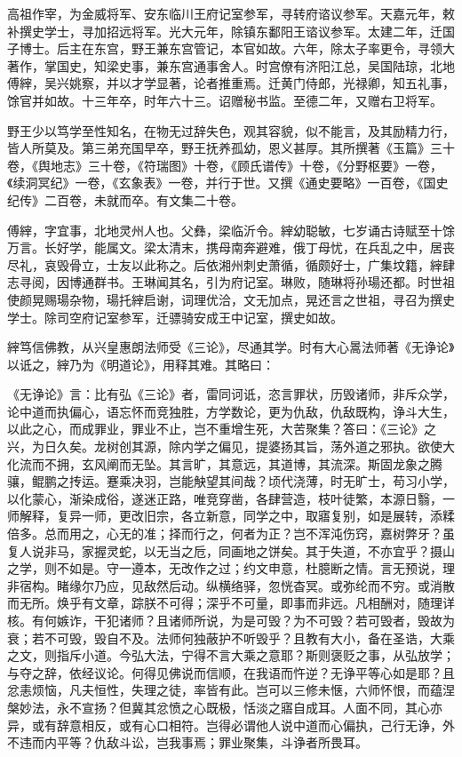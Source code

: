 \documentclass[]{article}
\begin{document}
高祖作宰，为金威将军、安东临川王府记室参军，寻转府谘议参军。天嘉元年，敕补撰史学士，寻加招远将军。光大元年，除镇东鄱阳王谘议参军。太建二年，迁国子博士。后主在东宫，野王兼东宫管记，本官如故。六年，除太子率更令，寻领大著作，掌国史，知梁史事，兼东宫通事舍人。时宫僚有济阳江总，吴国陆琼，北地傅縡，吴兴姚察，并以才学显著，论者推重焉。迁黄门侍郎，光禄卿，知五礼事，馀官并如故。十三年卒，时年六十三。诏赠秘书监。至德二年，又赠右卫将军。

野王少以笃学至性知名，在物无过辞失色，观其容貌，似不能言，及其励精力行，皆人所莫及。第三弟充国早卒，野王抚养孤幼，恩义甚厚。其所撰著《玉篇》三十卷，《舆地志》三十卷，《符瑞图》十卷，《顾氏谱传》十卷，《分野枢要》一卷，《续洞冥纪》一卷，《玄象表》一卷，并行于世。又撰《通史要略》一百卷，《国史纪传》二百卷，未就而卒。有文集二十卷。

傅縡，字宜事，北地灵州人也。父彝，梁临沂令。縡幼聪敏，七岁诵古诗赋至十馀万言。长好学，能属文。梁太清末，携母南奔避难，俄丁母忧，在兵乱之中，居丧尽礼，哀毁骨立，士友以此称之。后依湘州刺史萧循，循颇好士，广集坟籍，縡肆志寻阅，因博通群书。王琳闻其名，引为府记室。琳败，随琳将孙瑒还都。时世祖使颜晃赐瑒杂物，瑒托縡启谢，词理优洽，文无加点，晃还言之世祖，寻召为撰史学士。除司空府记室参军，迁骠骑安成王中记室，撰史如故。

縡笃信佛教，从兴皇惠朗法师受《三论》，尽通其学。时有大心暠法师著《无诤论》以诋之，縡乃为《明道论》，用释其难。其略曰：

《无诤论》言：比有弘《三论》者，雷同诃诋，恣言罪状，历毁诸师，非斥众学，论中道而执偏心，语忘怀而竞独胜，方学数论，更为仇敌，仇敌既构，诤斗大生，以此之心，而成罪业，罪业不止，岂不重增生死，大苦聚集？答曰：《三论》之兴，为日久矣。龙树创其源，除内学之偏见，提婆扬其旨，荡外道之邪执。欲使大化流而不拥，玄风阐而无坠。其言旷，其意远，其道博，其流深。斯固龙象之腾骧，鲲鹏之抟运。蹇乘决羽，岂能觖望其间哉？顷代浇薄，时无旷士，苟习小学，以化蒙心，渐染成俗，遂迷正路，唯竞穿凿，各肆营造，枝叶徒繁，本源日翳，一师解释，复异一师，更改旧宗，各立新意，同学之中，取寤复别，如是展转，添糅倍多。总而用之，心无的准；择而行之，何者为正？岂不浑沌伤窍，嘉树弊牙？虽复人说非马，家握灵蛇，以无当之卮，同画地之饼矣。其于失道，不亦宜乎？摄山之学，则不如是。守一遵本，无改作之过；约文申意，杜臆断之情。言无预说，理非宿构。睹缘尔乃应，见敌然后动。纵横络驿，忽恍杳冥。或弥纶而不穷。或消散而无所。焕乎有文章，踪朕不可得；深乎不可量，即事而非远。凡相酬对，随理详核。有何嫉诈，干犯诸师？且诸师所说，为是可毁？为不可毁？若可毁者，毁故为衰；若不可毁，毁自不及。法师何独蔽护不听毁乎？且教有大小，备在圣诰，大乘之文，则指斥小道。今弘大法，宁得不言大乘之意耶？斯则褒贬之事，从弘放学；与夺之辞，依经议论。何得见佛说而信顺，在我语而忤逆？无诤平等心如是耶？且忿恚烦恼，凡夫恒性，失理之徒，率皆有此。岂可以三修未惬，六师怀恨，而蕴涅槃妙法，永不宣扬？但冀其忿愤之心既极，恬淡之寤自成耳。人面不同，其心亦异，或有辞意相反，或有心口相符。岂得必谓他人说中道而心偏执，己行无诤，外不违而内平等？仇敌斗讼，岂我事焉；罪业聚集，斗诤者所畏耳。
\end{document}
